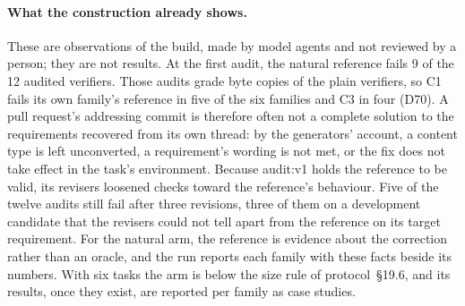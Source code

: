 \paragraph{What the construction already shows.} These are observations of the build, made by model agents and not reviewed by a person; they are not results. At the first audit, the natural reference fails 9 of the 12 audited verifiers. Those audits grade byte copies of the plain verifiers, so C1 fails its own family's reference in five of the six families and C3 in four (D70). A pull request's addressing commit is therefore often not a complete solution to the requirements recovered from its own thread: by the generators' account, a content type is left unconverted, a requirement's wording is not met, or the fix does not take effect in the task's environment. Because audit:v1 holds the reference to be valid, its revisers loosened checks toward the reference's behaviour. Five of the twelve audits still fail after three revisions, three of them on a development candidate that the revisers could not tell apart from the reference on its target requirement. For the natural arm, the reference is evidence about the correction rather than an oracle, and the run reports each family with these facts beside its numbers. With six tasks the arm is below the size rule of protocol~\S19.6, and its results, once they exist, are reported per family as case studies.
